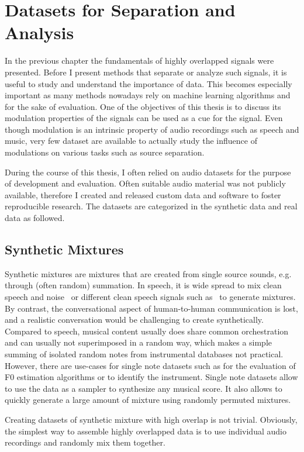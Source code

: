\chapter{Datasets for Separation and Analysis}
\label{cha:datasets}
In the previous chapter the fundamentals of highly overlapped signals were presented.
Before I present methods that separate or analyze such signals, it is useful to study and understand the importance of data.
This becomes especially important as many methods nowadays rely on machine learning algorithms and for the sake of evaluation.
One of the objectives of this thesis is to discuss its modulation properties of the signals can be used as a cue for the signal.
Even though modulation is an intrinsic property of audio recordings such as speech and music, very few dataset are available to actually study the influence of modulations on various tasks such as source separation.
\par
During the course of this thesis, I often relied on audio datasets for the purpose of development and evaluation.
Often suitable audio material was not publicly available, therefore I created and released custom data and software to foster reproducible research.
The datasets are categorized in the synthetic data and real data as followed.

\section{Synthetic Mixtures}

Synthetic mixtures are mixtures that are created from single source sounds, e.g. through (often random) summation. 
In speech, it is wide spread to mix clean speech and noise~\cite{varga93} or different clean speech signals such as~\cite{garofolo93} to generate mixtures.
By contrast, the conversational aspect of human-to-human communication is lost, and a realistic  conversation would be challenging to create synthetically.
Compared to speech, musical content usually does share common orchestration and can usually not superimposed in a random way, which makes a simple summing of isolated random notes from instrumental databases not practical.
However, there are use-cases for single note datasets such as for the evaluation of F0 estimation algorithms or to identify the instrument.
Single note datasets allow to use the data as a sampler to synthesize any musical score.
It also allows to quickly generate a large amount of mixture using randomly permuted mixtures.
\par
Creating datasets of synthetic mixture with high overlap is not trivial.
Obviously, the simplest way to assemble highly overlapped data is to use individual audio recordings and randomly mix them together.

